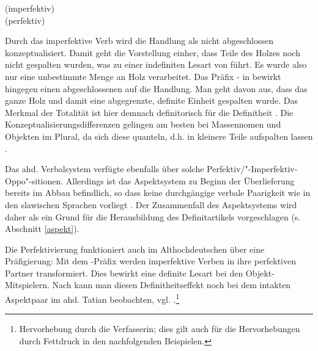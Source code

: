 \begin{exe}
	\ex \label{ex:russ-aspekt}   
	\begin{xlist}
		\ex \label{ex:russ-imper}  (imperfektiv) \\ 
		\ex \label{ex:russ-per}  (perfektiv) \\ 
		\end{xlist}
\end{exe}
\noindent
Durch das imperfektive Verb  wird die Handlung als nicht abgeschlossen konzeptualisiert. Damit  geht die Vorstellung einher, dass Teile des Holzes noch nicht gespalten wurden, was zu einer indefiniten Lesart von   führt. Es wurde also nur eine unbestimmte Menge an Holz verarbeitet. Das Präfix - in  bewirkt hingegen einen abgeschlossenen   auf die Handlung. Man geht davon aus, dass das ganze Holz und damit eine abgegrenzte, definite Einheit gespalten wurde.
Das Merkmal der Totalität ist hier demnach definitorisch für die Definitheit \parencite[14]{Leiss2000}. Die Konzeptualisierungsdifferenzen gelingen am besten bei Massennomen und Objekten im Plural, da sich diese quanteln, d.h. in kleinere Teile aufspalten lassen \parencite{Heindl2016}. 

Das ahd. Verbalsystem verfügte ebenfalls über solche Perfektiv/"-Imperfektiv-Oppo"-sitionen. Allerdings ist das Aspektsystem zu Beginn der Überlieferung bereits im Abbau befindlich, so dass keine durchgängige verbale Paarigkeit wie in den slawischen Sprachen vorliegt \parencite[3]{Eroms1997}. Der Zusammenfall des Aspektsystems wird daher als ein Grund für die Herausbildung des Definitartikels vorgeschlagen (s. Abschnitt \ref{aspekt}). 


Die Perfektivierung funktioniert auch im Althochdeutschen über eine Präfigierung: Mit dem -Präfix werden imperfektive Verben in ihre perfektiven Partner transformiert. Dies bewirkt eine definite Lesart bei den Objekt-Mitspielern. Nach \textcite[176--181]{Leiss2000} kann man diesen Definitheitseffekt noch bei dem intakten Aspektpaar  im ahd. Tatian beobachten, vgl. .\footnote{Hervorhebung durch die Verfasserin; dies gilt auch für die Hervorhebungen durch Fettdruck in den nachfolgenden Beispielen.}   

